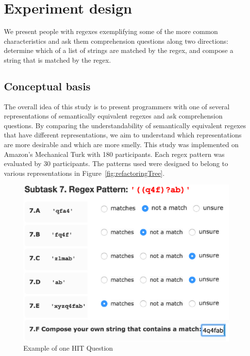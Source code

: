 
\section{Experiment design}

We present people with regexes exemplifying some of the more common characteristics and ask them comprehension questions along two directions: determine which of a list of strings are matched by the regex, and compose a string that is matched by the regex.

\subsection{Conceptual basis}

The overall idea of this study  is to present  programmers with one of several representations of semantically equivalent regexes and ask comprehension questions. By comparing the understandability of semantically equivalent regexes that have different representations, we aim to understand which representations  are more desirable and which are more smelly.
This study was  implemented on Amazon's Mechanical Turk with 180 participants.  Each regex pattern was evaluated by 30 participants.
The patterns used were designed to belong to various representations in Figure~\ref{fig:refactoringTree}.

\begin{figure}[tb]
\centering
\includegraphics[width=0.8\columnwidth]{nontex/illustrations/exampleQuestion.eps}
\vspace{-12pt}
\caption{Example of one HIT Question}
\vspace{-6pt}
\label{fig:exampleQuestion}
\end{figure}



